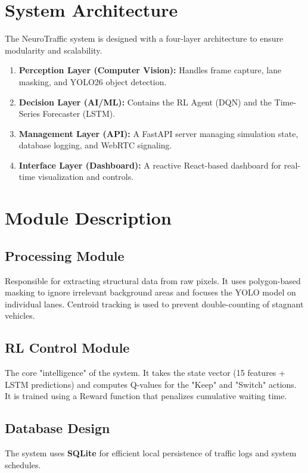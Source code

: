 \documentclass[12pt,a4paper]{report}
\begin{document}
\section{System Architecture}
The NeuroTraffic system is designed with a four-layer architecture to ensure modularity and scalability.
\begin{enumerate}
    \item \textbf{Perception Layer (Computer Vision):} Handles frame capture, lane masking, and YOLO26 object detection.
    \item \textbf{Decision Layer (AI/ML):} Contains the RL Agent (DQN) and the Time-Series Forecaster (LSTM).
    \item \textbf{Management Layer (API):} A FastAPI server managing simulation state, database logging, and WebRTC signaling.
    \item \textbf{Interface Layer (Dashboard):} A reactive React-based dashboard for real-time visualization and controls.
\end{enumerate}

\section{Module Description}
\subsection{Processing Module}
Responsible for extracting structural data from raw pixels. It uses polygon-based masking to ignore irrelevant background areas and focuses the YOLO model on individual lanes. Centroid tracking is used to prevent double-counting of stagnant vehicles.

\subsection{RL Control Module}
The core "intelligence" of the system. It takes the state vector (15 features + LSTM predictions) and computes Q-values for the "Keep" and "Switch" actions. It is trained using a Reward function that penalizes cumulative waiting time.

\subsection{Database Design}
The system uses \textbf{SQLite} for efficient local persistence of traffic logs and system schedules.
\end{document}
